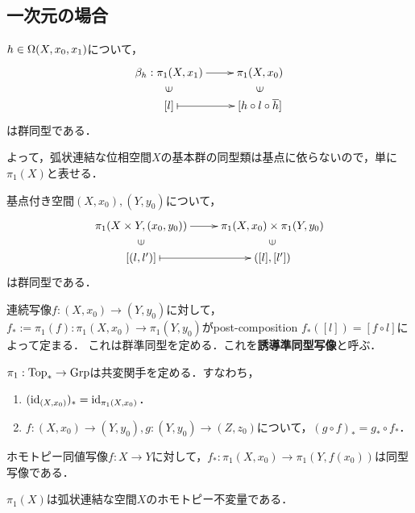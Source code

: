 \documentclass[uplatex,dvipdfmx]{jsreport}
\begin{document}
\subsection{一次元の場合}

\begin{proposition}[基点の取り替え]
    $h\in\Omega(X,x_0,x_1)$について，
    \[\xymatrix@R-2pc{
        \beta_h:\pi_1(X,x_1)\ar[r]&\pi_1(X,x_0)\\
        \rotatebox[origin=c]{90}{$\in$}&\rotatebox[origin=c]{90}{$\in$}\\
        {[l]}\ar@{|->}[r]&{[h\circ l\circ\o{h}]}
    }\]
    は群同型である．
\end{proposition}
\begin{remarks}
    よって，弧状連結な位相空間$X$の基本群の同型類は基点に依らないので，単に$\pi_1(X)$と表せる．
\end{remarks}

\begin{proposition}
    基点付き空間$(X,x_0),(Y,y_0)$について，
    \[\xymatrix@R-2pc{
        \pi_1(X\times Y,(x_0,y_0))\ar[r]&\pi_1(X,x_0)\times\pi_1(Y,y_0)\\
        \rotatebox[origin=c]{90}{$\in$}&\rotatebox[origin=c]{90}{$\in$}\\
        {[(l,l')]}\ar@{|->}[r]&{([l],[l'])}
    }\]
    は群同型である．
\end{proposition}

\begin{definition}
    連続写像$f:(X,x_0)\to(Y,y_0)$に対して，$f_*:=\pi_1(f):\pi_1(X,x_0)\to\pi_1(Y,y_0)$がpost-composition $f_*([l])=[f\circ l]$によって定まる．
    これは群準同型を定める．これを\textbf{誘導準同型写像}と呼ぶ．
\end{definition}

\begin{proposition}[共変関手]
    $\pi_1:\mathrm{Top}_*\to\mathrm{Grp}$は共変関手を定める．すなわち，
    \begin{enumerate}
        \item $(\mathrm{id}_{(X,x_0)})_*=\mathrm{id}_{\pi_1(X,x_0)}$．
        \item $f:(X,x_0)\to(Y,y_0),g:(Y,y_0)\to(Z,z_0)$について，$(g\circ f)_*=g_*\circ f_*$．
    \end{enumerate}
\end{proposition}

\begin{proposition}[基点は保つとは限らない]
    ホモトピー同値写像$f:X\to Y$に対して，$f_*:\pi_1(X,x_0)\to\pi_1(Y,f(x_0))$は同型写像である．
\end{proposition}
\begin{remarks}
    $\pi_1(X)$は弧状連結な空間$X$のホモトピー不変量である．
\end{remarks}
\end{document}
